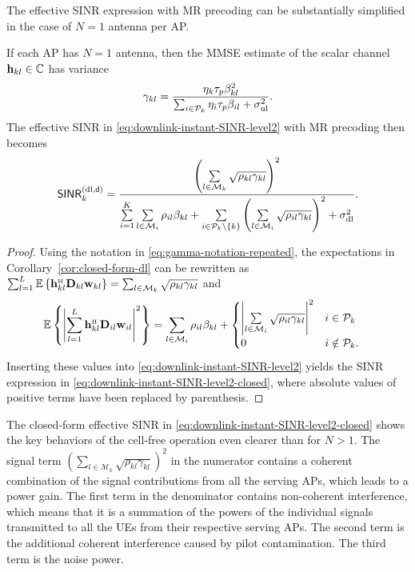 The effective SINR expression with MR precoding can be substantially simplified in the case of $N=1$ antenna per AP.

	\begin{corollary}
	If each AP has $N=1$ antenna, then the MMSE estimate of the scalar channel $\mathbf{h}_{kl}\in \mathbb{C}$ has variance
	\begin{equation} \label{eq:gamma-notation-repeated}
	 \gamma_{kl} = \frac{\eta_k \tau_p \beta_{kl}^2 }{ \sum_{i \in \mathcal{P}_k } \eta_i \tau_p \beta_{il} +\sigma^2_{\mathrm{ul}} }.
	 \end{equation}
	The effective SINR in \eqref{eq:downlink-instant-SINR-level2} with MR precoding then becomes
		\begin{equation} \label{eq:downlink-instant-SINR-level2-closed}
\mathsf{SINR}_{k}^{({\rm dl},\mathsf{d})} =  \frac{  \left( 
\sum\limits_{l \in \mathcal{M}_k} \sqrt{\rho_{kl} \gamma_{kl}} \right)^2  }{ \sum\limits_{i=1}^{K} \sum\limits_{l \in \mathcal{M}_i} \rho_{il} \beta_{kl} +
\sum\limits_{i \in \mathcal{P}_k \setminus \{ k \}} \left(  \sum\limits_{l \in \mathcal{M}_i} \sqrt{ \rho_{il} \gamma_{kl}}  \right)^2
+  \sigma^2_{\mathrm{dl}}
	}.
	\end{equation}
	\end{corollary}
	\begin{proof}
	Using the notation in \eqref{eq:gamma-notation-repeated}, the expectations in Corollary~\ref{cor:closed-form-dl} can be rewritten as 
$\sum_{l=1}^L  \mathbb{E}\left \{ \vect{h}_{kl}^{\Htran}\vect{D}_{kl}{\vect{w}}_{kl}\right \}
 = \sum_{l \in \mathcal{M}_k} \sqrt{\rho_{kl} \gamma_{kl}}$ and 
\begin{align} & \nonumber
 \mathbb{E} \left\{ \left| \sum\limits_{l=1}^{L}  \vect{h}_{kl}^{\Htran} \vect{D}_{il} {\vect{w}}_{il} \right|^2 \right\}  = \sum_{l \in \mathcal{M}_i} \rho_{il} \beta_{kl} + \begin{cases}
\left|  \sum\limits_{l \in \mathcal{M}_i} \sqrt{ \rho_{il} \gamma_{kl}}  \right|^2 &    i \in \mathcal{P}_k
\\
0 & i \notin \mathcal{P}_k.
\end{cases}
\end{align} 
Inserting these values into \eqref{eq:downlink-instant-SINR-level2} yields the SINR expression in \eqref{eq:downlink-instant-SINR-level2-closed}, where absolute values of positive terms have been replaced by parenthesis. 
	\end{proof}

The closed-form effective SINR in \eqref{eq:downlink-instant-SINR-level2-closed} shows the key behaviors of the cell-free operation even clearer than for $N>1$. The signal term $( 
\sum_{l \in \mathcal{M}_k} \sqrt{\rho_{kl} \gamma_{kl}} )^2$ in the numerator contains a coherent combination of the signal contributions from all the serving APs, which leads to a power gain.
 The first term in the denominator contains non-coherent interference, which means that it is a summation of the powers of the individual signals transmitted to all the UEs from their respective serving APs. The second term is the additional coherent interference caused by pilot contamination. The third term is the noise power.


